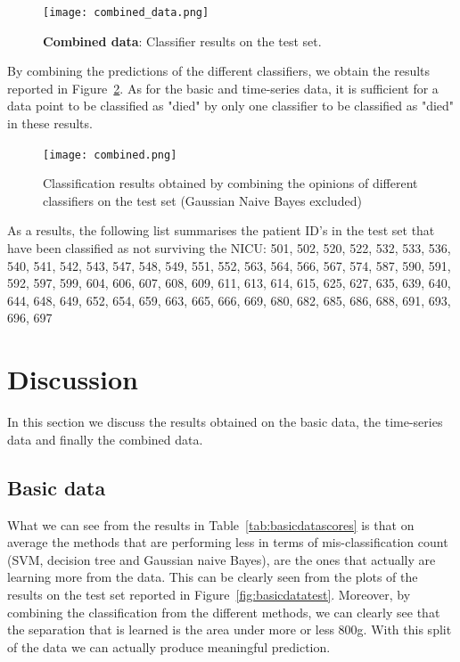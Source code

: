 \documentclass[a4paper,11pt]{article}
\begin{document}
\begin{figure}[H]
    \centering
\texttt{[image: combined\_data.png]}
    \caption{\textbf{Combined data}: Classifier results on the test set.}
    \label{fig:combtest}
\end{figure}

By combining the predictions of the different classifiers, we obtain the results reported in Figure~\ref{fig:comb}. As for the basic and time-series data, it is sufficient for a data point to be classified as "died" by only one classifier to be classified as "died" in these results.

\begin{figure}[H]
    \centering
    \texttt{[image: combined.png]}
    \caption{Classification results obtained by combining the opinions of different classifiers on the test set (Gaussian Naive Bayes excluded)}
    \label{fig:comb}
\end{figure}

As a results, the following list summarises the patient ID's in the test set that have been classified as not surviving the NICU: 501, 502, 520, 522, 532, 533, 536, 540, 541, 542, 543, 547, 548, 549, 551, 552, 563, 564, 566, 567, 574, 587, 590, 591, 592, 597, 599, 604, 606, 607, 608, 609, 611, 613, 614, 615, 625, 627, 635, 639, 640, 644, 648, 649, 652, 654, 659, 663, 665, 666, 669, 680, 682, 685, 686, 688, 691, 693, 696, 697


\section{Discussion}\label{sec:discussion}
In this section we discuss the results obtained on the basic data, the time-series data and finally the combined data.

\subsection*{Basic data}\label{sec:dis_basic_data}
What we can see from the results in Table~\ref{tab:basicdatascores} is that on average the methods that are performing less in terms of mis-classification count (SVM, decision tree and Gaussian naive Bayes), are the ones that actually are learning more from the data. This can be clearly seen from the plots of the results on the test set reported in Figure~\ref{fig:basicdatatest}. Moreover, by combining the classification from the different methods, we can clearly see that the separation that is learned is the area under more or less 800g. With this split of the data we can actually produce meaningful prediction.
\end{document}
